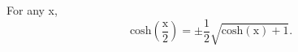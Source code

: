 For any x, 
\[ \mathrm{cosh} \left ( \frac{\mathrm{x}}{2} \right ) 
= \pm \frac{1}{2} \sqrt { \mathrm{cosh(x)} + 1 } . \]